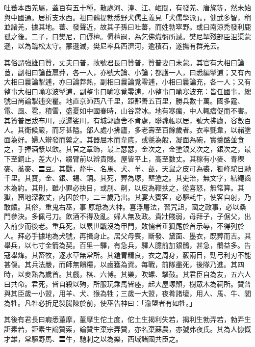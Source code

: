 
\begin{pinyinscope}

 吐蕃本西羌屬，蓋百有五十種，散處河、湟、江、岷間，有發羌、唐旄等，然未始與中國通。居析支水西。祖曰鶻提勃悉野犬儒主義見「犬儒學派」。，健武多智，稍並諸羌，據其地。蕃、發聲近，故其子孫曰吐蕃，而姓勃窣野。或曰南涼禿發利鹿孤之後。二子，曰樊尼，曰傉檀。傉檀嗣，為乞佛熾盤所滅。樊尼挈殘部臣沮渠蒙遜，以為臨松太守。蒙遜滅，樊尼率兵西濟河，逾積石，遂撫有群羌云。



 其俗謂強雄曰贊，丈夫曰普，故號君長曰贊普，贊普妻曰末蒙。其官有大相曰論茝，副相曰論茝扈莽，各一人，亦號大論、小論；都護一人，曰悉編掣逋；又有內大相曰曩論掣逋，亦曰論莽熱，副相曰曩論覓零逋，小相曰曩論充，各一人；又有整事大相曰喻寒波掣逋，副整事曰喻寒覓零逋，小整事曰喻寒波充：皆任國事，總號曰尚論掣逋突瞿。地直京師西八千里，距鄯善五百里，勝兵數十萬。國多霆、電、風、雹，積雪，盛夏如中國春時，山谷常冰。地有寒癘，中人輒痞促而不害。其贊普居跋布川，或邏娑川，有城郭廬舍不肯處，聯毳帳以居，號大拂廬，容數百人。其衛候嚴，而牙甚隘。部人處小拂廬，多老壽至百餘歲者。衣率氈韋，以赭塗面為好。婦人辮發而縈之。其器屈木而韋底，或氈為般，凝面為碗，實羹酪並食之，手捧酒漿以飲。其官之章飾，最上瑟瑟，金次之，金塗銀又次之，銀次之，最下至銅止，差大小，綴臂前以辨貴賤。屋皆平上，高至數丈。其稼有小麥、青稞麥、蕎麥、〓豆。其獸，犛牛、名馬、犬、羊、彘，天鼠之皮可為裘，獨峰駝日馳千里。其寶，金、銀、錫、銅。其死，葬為塚，塈塗之。其吏治，無文字，結繩齒木為約。其刑，雖小罪必抉目，或刖、劓，以皮為鞭抶之，從喜怒，無常算。其獄，窟地深數丈，內囚於中，二三歲乃出。其宴大賓客，必驅耗牛，使客自射，乃敢饋。其俗，重鬼右巫，事原羝為大神。喜浮屠法，習咒詛，國之政事，必以桑門參決。多佩弓刀。飲酒不得及亂。婦人無及政。貴壯賤弱，母拜子，子倨父，出入前少而後老。重兵死，以累世戰沒為甲門，敗懦者垂狐尾於首示辱，不得列於人。拜必手據地為犬號，再揖身止。居父母喪，斷發、黛面、墨衣，既葬而吉。其舉兵，以七寸金箭為契。百里一驛，有急兵，驛人臆前加銀鶻，甚急，鶻益多。告寇舉烽。其畜牧，逐水草無常所。其鎧胃精良，衣之周身，竅兩目，勁弓利刃不能甚傷。其兵法嚴，而師無饋糧，以鹵獲為資。每戰，前隊盡死，後隊乃進。其四時，以麥熟為歲首。其戲，棋、六博。其樂，吹螺、擊鼓。其君臣自為友，五六人曰共命。君死，皆自殺以殉，所服玩乘馬皆瘞，起大屋塚顛，樹眾木為祠所。贊普與其臣歲一小盟，用羊、犬、猴為牲；三歲一大盟，夜肴諸壇，用人、馬、牛、閭為牲。凡牲必折足裂腸陳於前，使巫告神曰：「渝盟者有如牲。」



 其後有君長曰瘕悉董摩，董摩生佗土度，佗土生揭利失若，揭利生勃弄若，勃弄生詎素若，詎素生論贊索，論贊生棄宗弄贊，亦名棄蘇農，亦號弗夜氏。其為人慷慨才雄，常驅野馬、〓牛，馳刺之以為樂，西域諸國共臣之。




\end{pinyinscope}

